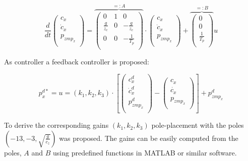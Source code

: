 \documentclass[english,ngerman]{KITreprt}
\newcommand{\clr}[2]{{\color{#1}{#2}}}
\newcommand{\todo}[1]{\marginpar{\clr{red}{#1}}}
\newcommand{\name}[1]{\textsc{#1}}
\begin{document}
\begin{equation} \label{eq:dyn-system-adaption}
\frac{d}{dt} \left(\begin{array}{c}
c_x \\
\dot{c}_x \\
p_{zmp_x} \\
\end{array} \right)
=
\overbrace{
\left(\begin{array}{ccc}
0 & 1 & 0\\
\frac{g}{z_c} & 0 & -\frac{g}{z_c} \\
0 & 0 & -\frac{1}{T_p} \\
\end{array}\right)
}^{ =: A}
\cdot
\left(\begin{array}{c}
c_x \\
\dot{c}_x \\
p_{zmp_x} \\
\end{array}\right)
+
\overbrace{
\left(\begin{array}{c}
0 \\
0 \\
\frac{1}{T_p} \\
\end{array}\right)
}^{ =: B}
u
\end{equation}

As controller a feedback controller is proposed:

\begin{equation}
p^{d*}_x = u = (k_1, k_2, k_3) \cdot
\left[
\left(\begin{array}{c}
c^d_x \\
\dot{c}^d_x \\
p^d_{zmp_x} \\
\end{array}\right)
-
\left(\begin{array}{c}
c_x \\
\dot{c_x} \\
p_{zmp_x} \\
\end{array}\right)
\right]
+ p^d_{zmp_x}
\end{equation}

\todo{fix gains in software.}

To derive the corresponding gains $(k_1, k_2, k_3)$ pole-placement with
the poles $(-13, -3, \sqrt{\frac{g}{c_z}})$ was proposed. The gains can
be easily computed from the poles, $A$ and $B$ using predefined
functions in \name{MATLAB} or similar software.
\end{document}
